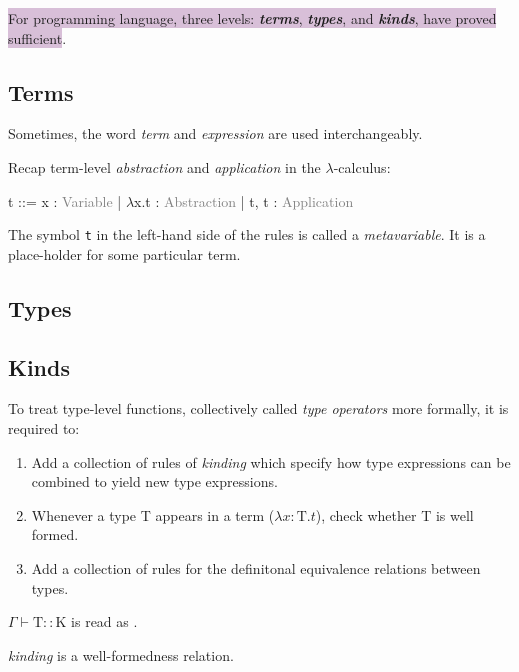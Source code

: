 \colorbox{thistle}{For programming language, three levels: \textit{\textbf{terms}}, \textit{\textbf{types}}, and \textit{\textbf{kinds}}, have proved sufficient}.

\subsection{Terms}

Sometimes, the word \textit{term} and \textit{expression} are used interchangeably.

Recap term-level \textit{abstraction} and \textit{application} in the $\lambda$-calculus:

\begin{bnfgrammar}
    t ::=
      x               : \textcolor{grey}{Variable}
    | $\lambda$x.t    : \textcolor{grey}{Abstraction}
    | t, t            : \textcolor{grey}{Application}
\end{bnfgrammar}

The symbol \texttt{t} in the left-hand side of the rules is called a \textit{metavariable}. It is a place-holder for some particular term.

\subsection{Types}

\subsection{Kinds}

\begin{question}{To treat type-level functions, collectively called \textit{type operators} more formally, it is required to:}
\begin{enumerate}
    \setlength\itemsep{-.3em}
    \item Add a collection of rules of \textit{kinding} which specify how type expressions can be combined to yield new type expressions.
    \item Whenever a type T appears in a term ($\lambda x:\text{T}.t$), check whether T is well formed.
    \item Add a collection of rules for the definitonal equivalence relations between types.
\end{enumerate}
\end{question}

$\Gamma \vdash \text{T}::\text{K}$ is read as .



\textit{kinding} is a well-formedness relation.

